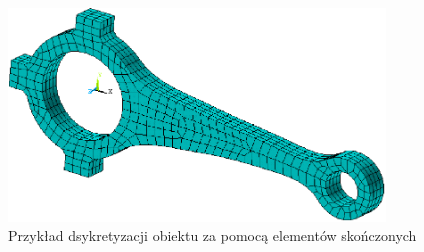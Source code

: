 \vspace{5 mm}

\begin{figure}[h]
\centering
\includegraphics[width=10cm]{Zdjecia/3/MES_przyklad}
\caption{Przykład dsykretyzacji obiektu za pomocą elementów skończonych}
\label{fig:MES_przyklad}
\end{figure}





















